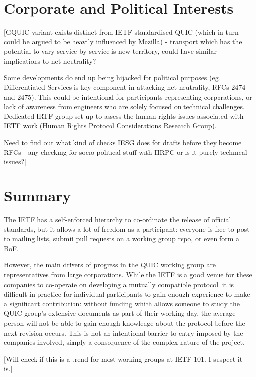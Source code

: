 \documentclass{l4proj}
\begin{document}
\section{Corporate and Political Interests}
[GQUIC variant exists distinct from IETF-standardised QUIC (which in turn could be argued to be heavily influenced by Mozilla) - transport which has the potential to vary service-by-service is new territory, could have similar implications to net neutrality?

Some developments do end up being hijacked for political purposes (eg. Differentiated Services is key component in attacking net neutrality, RFCs 2474 and 2475). This could be intentional for participants representing corporations, or lack of awareness from engineers who are solely focused on technical challenges. Dedicated IRTF group set up to assess the human rights issues associated with IETF work (Human Rights Protocol Considerations Research Group).

Need to find out what kind of checks IESG does for drafts before they become RFCs - any checking for socio-political stuff with HRPC or is it purely technical issues?]

\section{Summary}
The IETF has a self-enforced hierarchy to co-ordinate the release of official standards, but it allows a lot of freedom as a participant: everyone is free to post to mailing lists, submit pull requests on a working group repo, or even form a BoF.

However, the main drivers of progress in the QUIC working group are representatives from large corporations. While the IETF is a good venue for these companies to co-operate on developing a mutually compatible protocol, it is difficult in practice for individual participants to gain enough experience to make a significant contribution: without funding which allows someone to study the QUIC group's extensive documents as part of their working day, the average person will not be able to gain enough knowledge about the protocol before the next revision occurs. This is not an intentional barrier to entry imposed by the companies involved, simply a consequence of the complex nature of the project.

[Will check if this is a trend for most working groups at IETF 101. I suspect it is.]

\pagebreak
\end{document}
